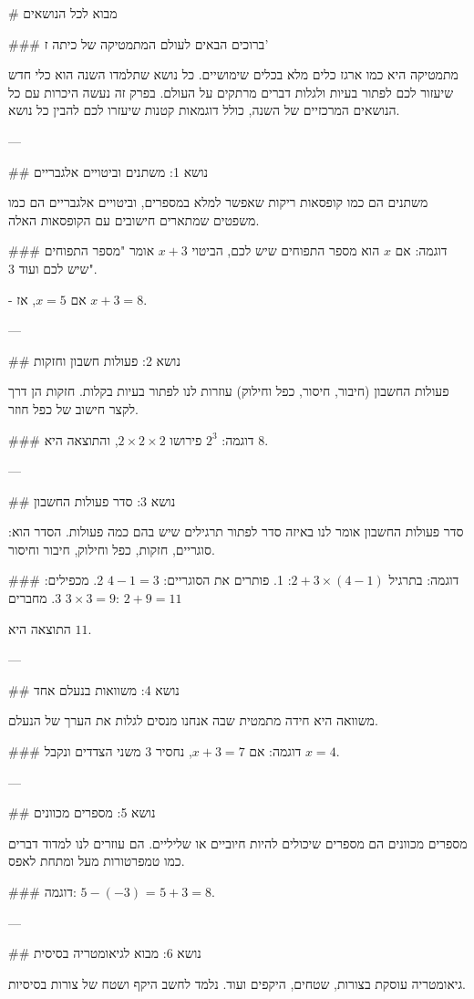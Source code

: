 # מבוא לכל הנושאים

### ברוכים הבאים לעולם המתמטיקה של כיתה ז'

מתמטיקה היא כמו ארגז כלים מלא בכלים שימושיים. כל נושא שתלמדו השנה הוא כלי חדש שיעזור לכם לפתור בעיות ולגלות דברים מרתקים על העולם. בפרק זה נעשה היכרות עם כל הנושאים המרכזיים של השנה, כולל דוגמאות קטנות שיעזרו לכם להבין כל נושא.

---

## נושא 1: משתנים וביטויים אלגבריים

משתנים הם כמו קופסאות ריקות שאפשר למלא במספרים, וביטויים אלגבריים הם כמו משפטים שמתארים חישובים עם הקופסאות האלה.

### דוגמה:
אם $x$ הוא מספר התפוחים שיש לכם, הביטוי $x + 3$ אומר "מספר התפוחים שיש לכם ועוד 3".

- אם $x = 5$, אז $x + 3 = 8$.

---

## נושא 2: פעולות חשבון וחזקות

פעולות החשבון (חיבור, חיסור, כפל וחילוק) עוזרות לנו לפתור בעיות בקלות. חזקות הן דרך לקצר חישוב של כפל חוזר.

### דוגמה:
$2^3$ פירושו $2 \times 2 \times 2$, והתוצאה היא $8$.

---

## נושא 3: סדר פעולות החשבון

סדר פעולות החשבון אומר לנו באיזה סדר לפתור תרגילים שיש בהם כמה פעולות. הסדר הוא: סוגריים, חזקות, כפל וחילוק, חיבור וחיסור.

### דוגמה:
בתרגיל $2 + 3 \times (4 - 1)$:
1. פותרים את הסוגריים: $4 - 1 = 3$
2. מכפילים: $3 \times 3 = 9$
3. מחברים: $2 + 9 = 11$

התוצאה היא $11$.

---

## נושא 4: משוואות בנעלם אחד

משוואה היא חידה מתמטית שבה אנחנו מנסים לגלות את הערך של הנעלם.

### דוגמה:
אם $x + 3 = 7$, נחסיר 3 משני הצדדים ונקבל $x = 4$.

---

## נושא 5: מספרים מכוונים

מספרים מכוונים הם מספרים שיכולים להיות חיוביים או שליליים. הם עוזרים לנו למדוד דברים כמו טמפרטורות מעל ומתחת לאפס.

### דוגמה:
$5 - (-3)$ = $5 + 3 = 8$.

---

## נושא 6: מבוא לגיאומטריה בסיסית

גיאומטריה עוסקת בצורות, שטחים, היקפים ועוד. נלמד לחשב היקף ושטח של צורות בסיסיות.

